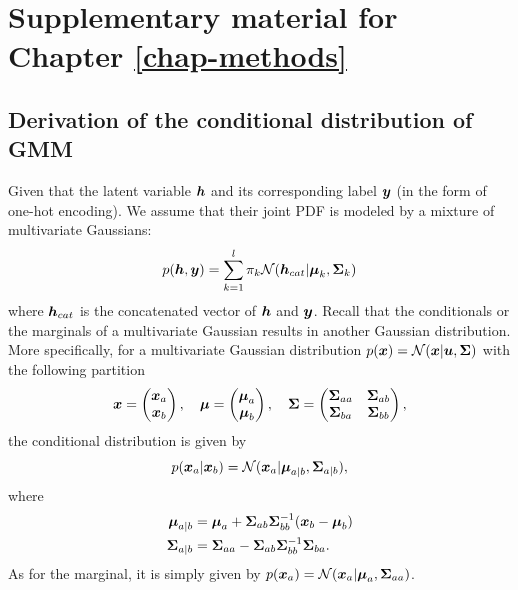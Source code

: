 \chapter{Supplementary material for
Chapter \ref{chap-methods}}
\section{Derivation of the conditional distribution of GMM}
\label{A-conGMM}
Given that the latent variable $\boldsymbol{h}$ and its corresponding label $\boldsymbol{y}$ (in the form of one-hot encoding). We assume that their joint PDF is modeled by a mixture of multivariate Gaussians:
\begin{equation}
    p(\boldsymbol{h},\boldsymbol{y}) = \sum_{k=1}^{l}\pi_{k}\mathcal{N}(\boldsymbol{h}_{cat}|\boldsymbol{\mu}_{k},\mathbf{\Sigma}_{k})
\end{equation}
where $\boldsymbol{h}_{cat}$ is the concatenated vector of $\boldsymbol{h}$ and $\boldsymbol{y}$. Recall that the conditionals or the marginals of a multivariate Gaussian results in another Gaussian distribution. More specifically, for a multivariate Gaussian distribution $p(\boldsymbol{x}) = \mathcal{N}(\boldsymbol{x}|\boldsymbol{u},\mathbf{\Sigma})$ with the following partition 
\begin{equation}
    \boldsymbol{x} = \begin{pmatrix}
        \boldsymbol{x}_a\\
        \boldsymbol{x}_b
    \end{pmatrix},\quad
    \boldsymbol{\mu} = \begin{pmatrix}
        \boldsymbol{\mu}_a\\
        \boldsymbol{\mu}_b
    \end{pmatrix},\quad
    \mathbf{\Sigma} = \begin{pmatrix}
        \mathbf{\Sigma}_{aa} & \mathbf{\Sigma}_{ab} \\
        \mathbf{\Sigma}_{ba} & \mathbf{\Sigma}_{bb} \\
    \end{pmatrix},
\end{equation}
the conditional distribution is given by
\begin{equation}
    p(\boldsymbol{x}_a|\boldsymbol{x}_b) = \mathcal{N}(\boldsymbol{x}_a | \boldsymbol{\mu}_{a|b},\mathbf{\Sigma}_{a|b}),
\end{equation}
where
\begin{equation}
    \begin{aligned}
         \boldsymbol{\mu}_{a|b} &= \boldsymbol{\mu}_a + \mathbf{\Sigma}_{ab} \mathbf{\Sigma}_{bb}^{-1} (\boldsymbol{x}_b - \boldsymbol{\mu}_b) \\
    \mathbf{\Sigma}_{a|b} &= \mathbf{\Sigma}_{aa} - \mathbf{\Sigma}_{ab} \mathbf{\Sigma}_{bb}^{-1} \mathbf{\Sigma}_{ba}.
    \end{aligned}
\end{equation}
As for the marginal, it is simply given by $p(\boldsymbol{x}_a) = \mathcal{N}(\boldsymbol{x}_a|\boldsymbol{\mu}_a,\mathbf{\Sigma}_{aa})$.


